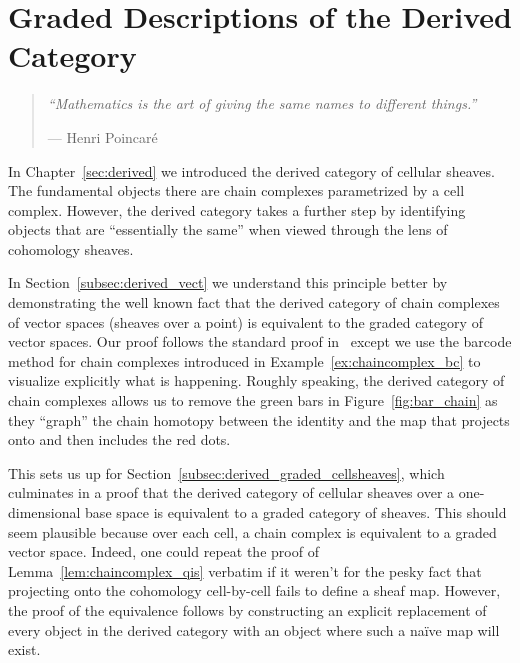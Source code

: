 
%
%
\chapter{Graded Descriptions of the Derived Category}
\label{sec:graded}

\begin{quote}
{\em``Mathematics is the art of giving the same names to different things.''}
\begin{flushright} --- Henri Poincar\'e~\cite{poincare1908future} \end{flushright}
\end{quote}

In Chapter~\ref{sec:derived} we introduced the derived category of cellular sheaves. The fundamental objects there are chain complexes parametrized by a cell complex. However, the derived category takes a further step by identifying objects that are ``essentially the same'' when viewed through the lens of cohomology sheaves.

In Section~\ref{subsec:derived_vect} we understand this principle better by demonstrating the well known fact that the derived category of chain complexes of vector spaces (sheaves over a point) is equivalent to the graded category of vector spaces. Our proof follows the standard proof in~\cite{weibel} except we use the barcode method for chain complexes introduced in Example~\ref{ex:chaincomplex_bc} to visualize explicitly what is happening. Roughly speaking, the derived category of chain complexes allows us to remove the green bars in Figure~\ref{fig:bar_chain} as they ``graph'' the chain homotopy between the identity and the map that projects onto and then includes the red dots.

This sets us up for Section~\ref{subsec:derived_graded_cellsheaves}, which culminates in a proof that the derived category of cellular sheaves over a one-dimensional base space is equivalent to a graded category of sheaves. This should seem plausible because over each cell, a chain complex is equivalent to a graded vector space. Indeed, one could repeat the proof of Lemma~\ref{lem:chaincomplex_qis} verbatim if it weren't for the pesky fact that projecting onto the cohomology cell-by-cell fails to define a sheaf map. However, the proof of the equivalence follows by constructing an explicit replacement of every object in the derived category with an object where such a na\"ive map will exist.

